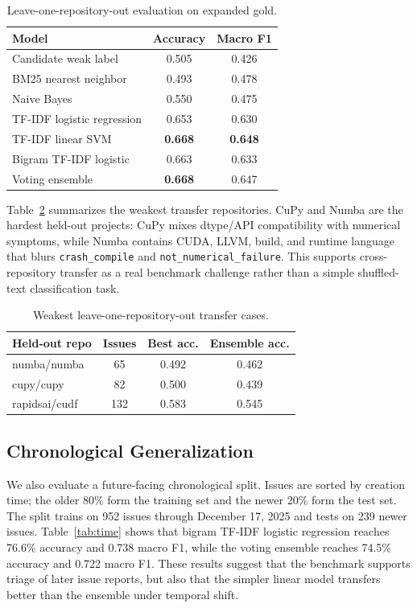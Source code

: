 \documentclass[conference]{IEEEtran}
\begin{document}
\begin{table}[t]
\centering
\caption{Leave-one-repository-out evaluation on expanded gold.}
\label{tab:loro}
\begin{tabular}{lcc}
\toprule
Model & Accuracy & Macro F1 \\
\midrule
Candidate weak label & 0.505 & 0.426 \\
BM25 nearest neighbor & 0.493 & 0.478 \\
Naive Bayes & 0.550 & 0.475 \\
TF-IDF logistic regression & 0.653 & 0.630 \\
TF-IDF linear SVM & \textbf{0.668} & \textbf{0.648} \\
Bigram TF-IDF logistic & 0.663 & 0.633 \\
Voting ensemble & \textbf{0.668} & 0.647 \\
\bottomrule
\end{tabular}
\end{table}

Table~\ref{tab:repo_weakness} summarizes the weakest transfer repositories.
CuPy and Numba are the hardest held-out projects: CuPy mixes dtype/API
compatibility with numerical symptoms, while Numba contains CUDA, LLVM, build,
and runtime language that blurs \texttt{crash\_compile} and
\texttt{not\_numerical\_failure}. This supports cross-repository transfer as a
real benchmark challenge rather than a simple shuffled-text classification
task.

\begin{table}[t]
\centering
\caption{Weakest leave-one-repository-out transfer cases.}
\label{tab:repo_weakness}
\begin{tabular}{lccc}
\toprule
Held-out repo & Issues & Best acc. & Ensemble acc. \\
\midrule
numba/numba & 65 & 0.492 & 0.462 \\
cupy/cupy & 82 & 0.500 & 0.439 \\
rapidsai/cudf & 132 & 0.583 & 0.545 \\
\bottomrule
\end{tabular}
\end{table}

\subsection{Chronological Generalization}

We also evaluate a future-facing chronological split. Issues are sorted by
creation time; the older 80\% form the training set and the newer 20\% form the
test set. The split trains on 952 issues through December 17, 2025 and tests on
239 newer issues. Table~\ref{tab:time} shows that bigram TF-IDF logistic
regression reaches 76.6\% accuracy and 0.738 macro F1, while the voting
ensemble reaches 74.5\% accuracy and 0.722 macro F1. These results suggest
that the benchmark supports triage of later issue reports, but also that the
simpler linear model transfers better than the ensemble under temporal shift.
\end{document}
